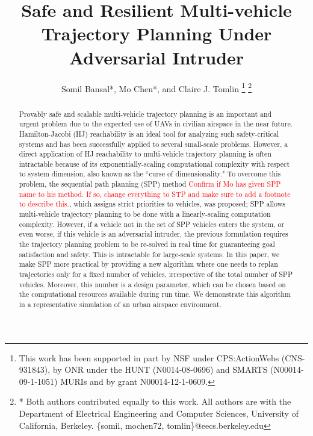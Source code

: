 \documentclass[journal]{IEEEtran}
\title{\LARGE \bf Safe and Resilient Multi-vehicle Trajectory Planning Under Adversarial Intruder}
\author{Somil Bansal*, Mo Chen*, and Claire J. Tomlin
\thanks{This work has been supported in part by NSF under CPS:ActionWebs (CNS-931843), by ONR under the HUNT (N0014-08-0696) and SMARTS (N00014-09-1-1051) MURIs and by grant N00014-12-1-0609.}
\thanks{* Both authors contributed equally to this work. All authors are with the Department of Electrical Engineering and Computer Sciences, University of California, Berkeley. \{somil, mochen72, tomlin\}@eecs.berkeley.edu}
}
\newcommand{\MCnote}{\textcolor{red}}
\begin{document}
\maketitle
\thispagestyle{empty}
\pagestyle{empty}

\begin{abstract}
Provably safe and scalable multi-vehicle trajectory planning is an important and urgent problem due to the expected use of UAVs in civilian airspace in the near future. Hamilton-Jacobi (HJ) reachability is an ideal tool for analyzing such safety-critical systems and has been successfully applied to several small-scale problems. However, a direct application of HJ reachability to multi-vehicle trajectory planning is often intractable because of its exponentially-scaling computational complexity with respect to system dimension, also known as the ``curse of dimensionality." To overcome this problem, the sequential path planning (SPP) method \MCnote{Confirm if Mo has given SPP name to his method. If so, change everything to STP and make sure to add a footnote to describe this.}, which assigns strict priorities to vehicles, was proposed; SPP allows multi-vehicle trajectory planning to be done with a linearly-scaling computation complexity. However, if a vehicle not in the set of SPP vehicles enters the system, or even worse, if this vehicle is an adversarial intruder, the previous formulation requires the trajectory planning problem to be re-solved in real time for guaranteeing goal satisfaction and safety. This is intractable for large-scale systems. In this paper, we make SPP more practical by providing a new algorithm where one needs to replan trajectories only for a fixed number of vehicles, irrespective of the total number of SPP vehicles. Moreover, this number is a design parameter, which can be chosen based on the computational resources available during run time. We demonstrate this algorithm in a representative simulation of an urban airspace environment.    
\end{abstract}









%








\end{document}
